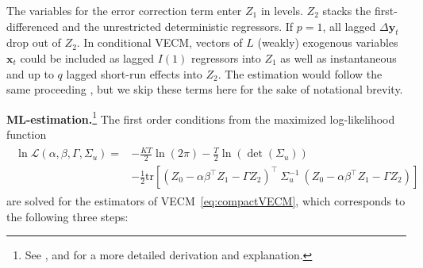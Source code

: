 The variables for the error correction term enter $ Z_1 $ in levels. $ Z_2 $ stacks the first-differenced and the unrestricted deterministic regressors. If $ p=1 $, all lagged $ \Delta \boldsymbol{y}_{t} $ drop out of $ Z_2 $. In conditional VECM, vectors of $ L $ (weakly) exogenous variables $ \boldsymbol{x}_t $ could be included as lagged $I(1)$ regressors into $ Z_1 $ as well as instantaneous and up to $ q $ lagged short-run effects into $ Z_2 $. The estimation would follow the same proceeding \citep[p.~398]{PesaranEtAl2000,Lutkepohl2005}, but we skip these terms here for the sake of notational brevity.


\textbf{ML-estimation.}\footnote{See \citet[Ch.~6]{Johansen1996}, \citet[Ch.~7.2.3]{Lutkepohl2005} and \citet[Ch.~3.1]{Lutkepohl2006} for a more detailed derivation and explanation.} The first order conditions from the maximized log-likelihood function
\begin{align} \label{eq:vecmLikeli}
\begin{split}
	\ln \mathcal{L} \left(\alpha, \beta, \Gamma, \Sigma_u \right) = & - \frac{KT}{2} \ln \left( 2\pi \right) - \frac{T}{2} \ln \left( \det ( \Sigma_u ) \right) \\
	& - \frac{1}{2} \text{tr} \left[ \left( Z_{0} - \alpha\beta^\top Z_{1} - \Gamma Z_{2} \right)^\top \ \Sigma_u^{-1} \ \left( Z_{0} - \alpha\beta^\top Z_{1} - \Gamma Z_{2} \right) \right]
\end{split}
\end{align} 
are solved for the estimators of VECM~\eqref{eq:compactVECM}, which corresponds to the following three steps:
